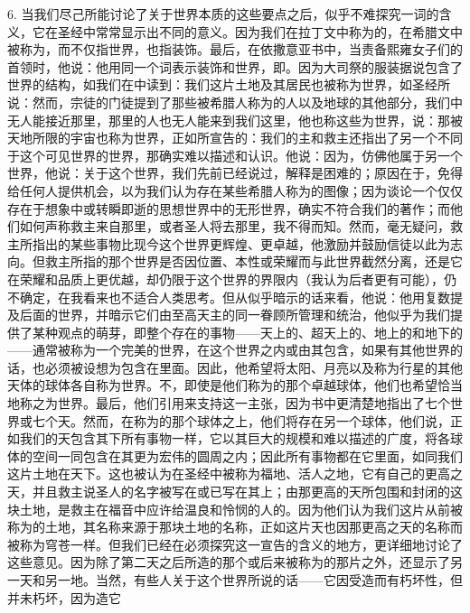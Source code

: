 6. 当我们尽己所能讨论了关于世界本质的这些要点之后，似乎不难探究一词的含义，它在圣经中常常显示出不同的意义。因为我们在拉丁文中称为的，在希腊文中被称为，而不仅指世界，也指装饰。最后，在依撒意亚书中，当责备熙雍女子们的首领时，他说：他用同一个词表示装饰和世界，即。因为大司祭的服装据说包含了世界的结构，如我们在中读到：我们这片土地及其居民也被称为世界，如圣经所说：然而，宗徒的门徒提到了那些被希腊人称为的人以及地球的其他部分，我们中无人能接近那里，那里的人也无人能来到我们这里，他也称这些为世界，说：那被天地所限的宇宙也称为世界，正如所宣告的：我们的主和救主还指出了另一个不同于这个可见世界的世界，那确实难以描述和认识。他说：因为，仿佛他属于另一个世界，他说：关于这个世界，我们先前已经说过，解释是困难的；原因在于，免得给任何人提供机会，以为我们认为存在某些希腊人称为的图像；因为谈论一个仅仅存在于想象中或转瞬即逝的思想世界中的无形世界，确实不符合我们的著作；而他们如何声称救主来自那里，或者圣人将去那里，我不得而知。然而，毫无疑问，救主所指出的某些事物比现今这个世界更辉煌、更卓越，他激励并鼓励信徒以此为志向。但救主所指的那个世界是否因位置、本性或荣耀而与此世界截然分离，还是它在荣耀和品质上更优越，却仍限于这个世界的界限内（我认为后者更有可能），仍不确定，在我看来也不适合人类思考。但从似乎暗示的话来看，他说：他用复数提及后面的世界，并暗示它们由至高天主的同一眷顾所管理和统治，他似乎为我们提供了某种观点的萌芽，即整个存在的事物——天上的、超天上的、地上的和地下的——通常被称为一个完美的世界，在这个世界之内或由其包含，如果有其他世界的话，也必须被设想为包含在里面。因此，他希望将太阳、月亮以及称为行星的其他天体的球体各自称为世界。不，即使是他们称为的那个卓越球体，他们也希望恰当地称之为世界。最后，他们引用来支持这一主张，因为书中更清楚地指出了七个世界或七个天。然而，在称为的那个球体之上，他们将存在另一个球体，他们说，正如我们的天包含其下所有事物一样，它以其巨大的规模和难以描述的广度，将各球体的空间一同包含在其更为宏伟的圆周之内；因此所有事物都在它里面，如同我们这片土地在天下。这也被认为在圣经中被称为福地、活人之地，它有自己的更高之天，并且救主说圣人的名字被写在或已写在其上；由那更高的天所包围和封闭的这块土地，是救主在福音中应许给温良和怜悯的人的。因为他们认为我们这片从前被称为的土地，其名称来源于那块土地的名称，正如这片天也因那更高之天的名称而被称为穹苍一样。但我们已经在必须探究这一宣告的含义的地方，更详细地讨论了这些意见。因为除了第二天之后所造的那个或后来被称为的那片之外，还显示了另一天和另一地。当然，有些人关于这个世界所说的话——它因受造而有朽坏性，但并未朽坏，因为造它